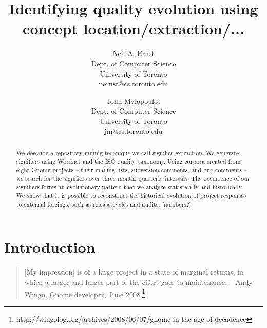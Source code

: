 \documentclass[conference, compsoc]{IEEEtran}
\begin{document}


\title{Identifying quality evolution using concept location/extraction/...}
\author{
Neil A. Ernst\\Dept. of Computer Science\\University of Toronto\\nernst@cs.toronto.edu \and
John Mylopoulos\\Dept. of Computer Science\\University of Toronto\\jm@cs.toronto.edu }

\maketitle

\begin{abstract}
We describe a repository mining technique we call signifier extraction. We generate signifiers using Wordnet and the ISO quality taxonomy. Using corpora created from eight Gnome projects -- their mailing lists, subversion comments, and bug comments -- we search for the signifiers over three month, quarterly intervals. The occurrence of our signifiers forms an evolutionary pattern that we analyze statistically and historically. We show that it is possible to reconstruct the historical evolution of project responses to external forcings, such as release cycles and audits. [numbers?]
\end{abstract}

\section{Introduction}\label{sect:introduction}
\begin{quote}[My impression] is of a large project in a state of marginal returns, in which a larger and larger part of the effort goes to maintenance. -- Andy Wingo, Gnome developer, June 2008.\footnote{http://wingolog.org/archives/2008/06/07/gnome-in-the-age-of-decadence}\end{quote}
	
\end{document}
